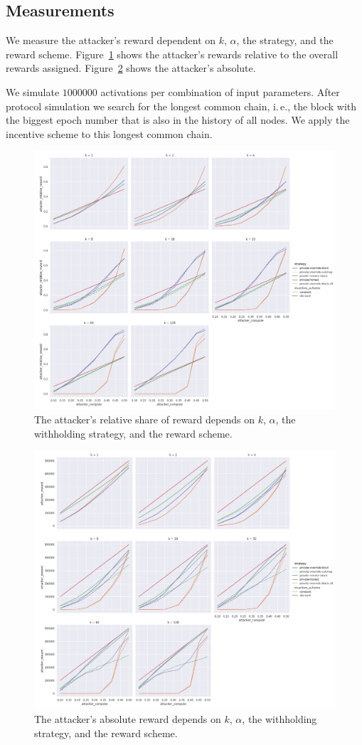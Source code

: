 \documentclass{article}
\begin{document}
\subsection{Measurements}

We measure the attacker's reward dependent on $k$, $\alpha$, the strategy, and the reward scheme.
Figure~\ref{fig:withholding_relative} shows the attacker's rewards relative to the overall rewards assigned.
Figure~\ref{fig:withholding_absolute} shows the attacker's absolute.

We simulate $1 000 000$ activations per combination of input parameters.
After protocol simulation we search for the longest common chain, i.\,e., the block with the biggest epoch number that is also in the history of all nodes.
We apply the incentive scheme to this longest common chain.

\begin{figure}
  \includegraphics[width=\linewidth]{fig/withholding_relative}
  \caption{
    The attacker's relative share of reward depends on $k$, $\alpha$, the withholding strategy, and the reward scheme.
  }
  \label{fig:withholding_relative}
\end{figure}

\begin{figure}
  \includegraphics[width=\linewidth]{fig/withholding_absolute}
  \caption{
    The attacker's absolute reward depends on $k$, $\alpha$, the withholding strategy, and the reward scheme.
  }
  \label{fig:withholding_absolute}
\end{figure}
\end{document}
